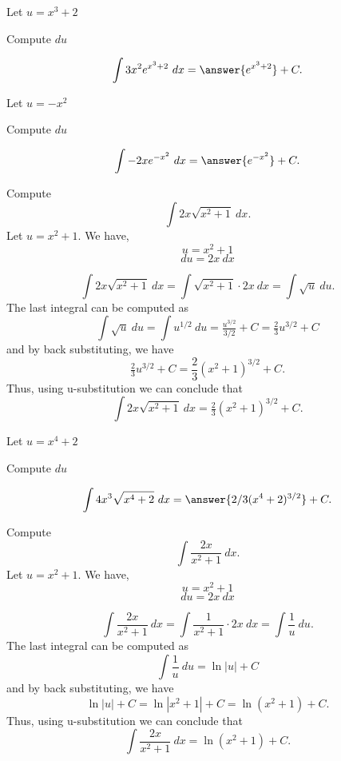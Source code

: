 \documentclass{ximera}
\begin{document}
\begin{problem}
\begin{hint}
Let $u = x^3 + 2$
\end{hint}
\begin{hint}
Compute $du$
\end{hint}
\[\int 3x^2e^{x^3 + 2} \ dx = \answer{e^{x^3 + 2}} +C.\]
\end{problem}

\begin{problem}
\begin{hint}
Let $u = -x^2$
\end{hint}
\begin{hint}
Compute $du$
\end{hint}
\[\int -2xe^{-x^2} \ dx = \answer{e^{-x^2}} +C.\]
\end{problem}

\begin{example} Compute 
\[\int 2x\sqrt{x^2 + 1} \ dx.\]
Let $u = x^2 + 1$.  We have,
\[u = x^2 + 1\]
\[du = 2x \ dx\]

\[\int 2x\sqrt{x^2 + 1} \ dx = \int \sqrt{x^2 + 1} \cdot 2x\  dx = \int \sqrt{u} \ du.\]
The last integral can be computed as 
\[\int \sqrt u  \ du = \int u^{1/2} \ du = \tfrac{u^{3/2}}{3/2} + C = \tfrac23 u^{3/2} + C\]
and by back substituting, we have 
\[\tfrac23 u^{3/2}  + C = \frac23 (x^2 + 1)^{3/2} + C.\]
Thus, using u-substitution we can conclude that
\[\int 2x\sqrt{x^2 + 1} \ dx =  \tfrac23 (x^2 + 1)^{3/2} + C.\]
\end{example}

\begin{problem}
\begin{hint}
Let $u = x^4 + 2$
\end{hint}
\begin{hint}
Compute $du$
\end{hint}
\[\int 4x^3 \sqrt{x^4 +2} \ dx = \answer{2/3(x^4 +2)^{3/2}} +C.\]
\end{problem}



\begin{example} Compute 
\[\int \frac{2x}{x^2 + 1} \ dx.\]
Let $u = x^2 + 1$.  We have,
\[u = x^2 + 1\]
\[du = 2x \ dx\]

\[\int \frac{2x}{x^2 + 1} \ dx = \int \frac{1}{x^2 + 1} \cdot 2x\  dx = \int \frac{1}{u} \ du.\]
The last integral can be computed as 
\[\int \frac{1}{u} \ du = \ln|u| + C\]
and by back substituting, we have 
\[\ln|u| + C =  \ln|x^2 + 1| + C=\ln(x^2 + 1) + C.\]
Thus, using u-substitution we can conclude that
\[\int \frac{2x}{x^2 + 1} \ dx =  \ln(x^2 + 1) + C.\]
\end{example}
\end{document}
